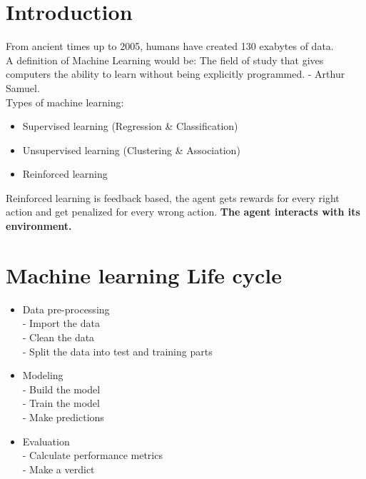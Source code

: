 \documentclass[11pt, a4paper]{article}
\begin{document}
	
	
	\section{Introduction}
	From ancient times up to 2005, humans have created 130 exabytes of data. \\
	
	A definition of Machine Learning would be: The field of study that gives computers the ability to learn without being explicitly programmed. - Arthur Samuel. \\
	
	Types of machine learning:
	\begin{itemize}
		\item Supervised learning (Regression \& Classification)
		\item Unsupervised learning (Clustering \& Association)
		\item Reinforced learning
	\end{itemize} 

Reinforced learning is feedback based, the agent gets rewards for every right action and get penalized for every wrong action.  \textbf{The agent interacts with its environment.} \\

\section{Machine learning Life cycle}

	\begin{itemize}
		\item Data pre-processing \\
		- Import the data \\
		- Clean the data \\
		- Split the data into test and training parts

		\item Modeling \\
		- Build the model \\
		- Train the model \\
		- Make predictions

		\item Evaluation \\
		- Calculate performance metrics \\
		- Make a verdict
	\end{itemize}
\end{document}
